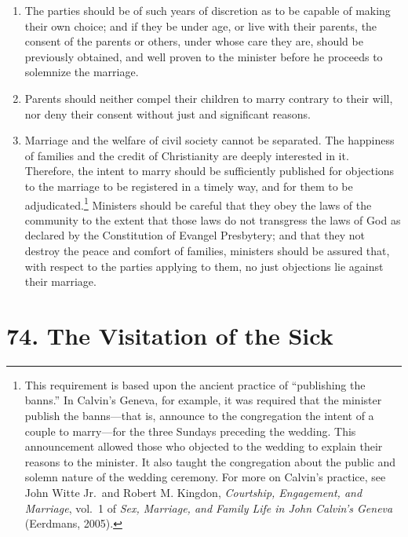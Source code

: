 \documentclass[
]{book}
\providecommand{\tightlist}{%
  \setlength{\itemsep}{0pt}\setlength{\parskip}{0pt}}
\begin{document}
\begin{enumerate}
\def\labelenumi{\arabic{enumi}.}
\setcounter{enumi}{4}
\tightlist
\item
  The parties should be of such years of discretion as to be capable of making their own choice; and if they be under age, or live with their parents, the consent of the parents or others, under whose care they are, should be previously obtained, and well proven to the minister before he proceeds to solemnize the marriage.
\item
  Parents should neither compel their children to marry contrary to their will, nor deny their consent without just and significant reasons.
\item
  Marriage and the welfare of civil society cannot be separated. The happiness of families and the credit of Christianity are deeply interested in it. Therefore, the intent to marry should be sufficiently published for objections to the marriage to be registered in a timely way, and for them to be adjudicated.\footnote{This requirement is based upon the ancient practice of ``publishing the banns.'' In Calvin's Geneva, for example, it was required that the minister publish the banns---that is, announce to the congregation the intent of a couple to marry---for the three Sundays preceding the wedding. This announcement allowed those who objected to the wedding to explain their reasons to the minister. It also taught the congregation about the public and solemn nature of the wedding ceremony. For more on Calvin's practice, see John Witte Jr.~and Robert M. Kingdon, \emph{Courtship, Engagement, and Marriage}, vol.~1 of \emph{Sex, Marriage, and Family Life in John Calvin's Geneva} (Eerdmans, 2005).} Ministers should be careful that they obey the laws of the community to the extent that those laws do not transgress the laws of God as declared by the Constitution of Evangel Presbytery; and that they not destroy the peace and comfort of families, ministers should be assured that, with respect to the parties applying to them, no just objections lie against their marriage.
\end{enumerate}

\hypertarget{the-visitation-of-the-sick}{%
\section*{74. The Visitation of the Sick}\label{the-visitation-of-the-sick}}

\protect\hypertarget{chapter-slug-74-the-visitation-of-the-sick}{\href{}{}}
\end{document}
